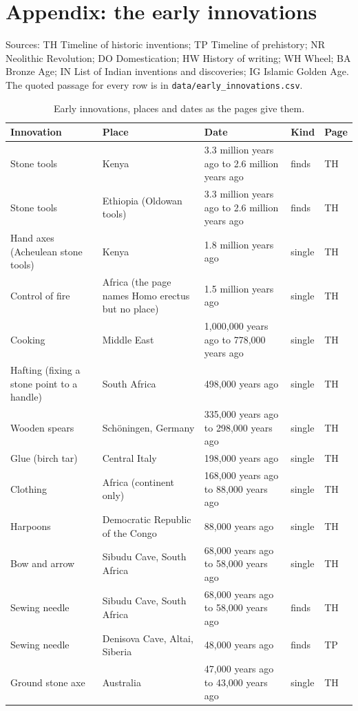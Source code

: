 \documentclass[11pt,a4paper]{article}
\begin{document}
\clearpage\section*{Appendix: the early innovations}\footnotesize Sources: TH Timeline of historic inventions; TP Timeline of prehistory; NR Neolithic Revolution; DO Domestication; HW History of writing; WH Wheel; BA Bronze Age; IN List of Indian inventions and discoveries; IG Islamic Golden Age. The quoted passage for every row is in \texttt{data/early\_innovations.csv}.
\setlength{\tabcolsep}{4pt}\begin{longtable}{p{3.3cm}p{5.2cm}p{3.3cm}p{1.7cm}l}\caption{Early innovations, places and dates as the pages give them.}\label{tab:early}\\\toprule Innovation & Place & Date & Kind & Page\\\midrule\endhead
Stone tools & Kenya & 3.3 million years ago to 2.6 million years ago & finds & TH\\
Stone tools & Ethiopia (Oldowan tools) & 3.3 million years ago to 2.6 million years ago & finds & TH\\
Hand axes (Acheulean stone tools) & Kenya & 1.8 million years ago & single & TH\\
Control of fire & Africa (the page names Homo erectus but no place) & 1.5 million years ago & single & TH\\
Cooking & Middle East & 1,000,000 years ago to 778,000 years ago & single & TH\\
Hafting (fixing a stone point to a handle) & South Africa & 498,000 years ago & single & TH\\
Wooden spears & Schöningen, Germany & 335,000 years ago to 298,000 years ago & single & TH\\
Glue (birch tar) & Central Italy & 198,000 years ago & single & TH\\
Clothing & Africa (continent only) & 168,000 years ago to 88,000 years ago & single & TH\\
Harpoons & Democratic Republic of the Congo & 88,000 years ago & single & TH\\
Bow and arrow & Sibudu Cave, South Africa & 68,000 years ago to 58,000 years ago & single & TH\\
Sewing needle & Sibudu Cave, South Africa & 68,000 years ago to 58,000 years ago & finds & TH\\
Sewing needle & Denisova Cave, Altai, Siberia & 48,000 years ago & finds & TP\\
Ground stone axe & Australia & 47,000 years ago to 43,000 years ago & single & TH\\

\end{longtable}
\end{document}
